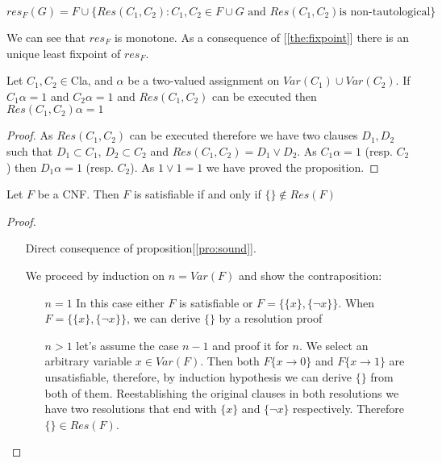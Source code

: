 $$res_F(G) = F \cup \{Res(C_1,C_2) : C_1,C_2 \in F \cup G \text{ and } Res(C_1,C_2) \text{is non-tautological}\}$$


We can see that $res_F$ is monotone. As a consequence of [\ref{the:fixpoint}] there is an unique least fixpoint of $res_F$.

\begin{proposition} \label{pro:sound}
  Let $C_1, C_2 \in $Cla, and $\alpha$ be a two-valued assignment on $Var(C_1)\cup Var(C_2)$. If $C_1 \alpha = 1$ and $C_2 \alpha = 1$ and $Res(C_1,C_2)$ can be executed then $Res(C_1,C_2) \alpha = 1$
\end{proposition}
\begin{proof}
As $Res(C_1,C_2)$ can be executed therefore we have two clauses $D_1,D_2$ such that $D_1 \subset C_1$, $D_2 \subset C_2$ and $Res(C_1,C_2) = D_1\vee D_2$. As $C_1\alpha = 1$ (resp. $C_2$) then $D_1\alpha = 1$ (resp. $C_2$). As $1 \vee 1=1$ we have proved the proposition.
\end{proof}


\begin{theorem}
Let $F$ be a CNF. Then $F$ is satisfiable if and only if $\{\} \not\in Res(F)$
\end{theorem}
\begin{proof}\hfill
  \begin{itemize}\item[\fbox{$\Rightarrow$}] Direct consequence of proposition[\ref{pro:sound}].
  \item[\fbox{$\Leftarrow$}] We proceed by induction on $n = Var(F)$ and show the contraposition:
    \begin{itemize}
    \item[$n=1$] In this case either $F$ is satisfiable or $F = \{\{x\},\{\neg x\}\}$.  When $F = \{\{x\},\{\neg x\}\}$, we can derive $\{\}$ by a resolution proof
      
    \item[$n>1$] let's assume the case $n-1$ and proof it for $n$. We select an arbitrary variable $x\in Var(F)$. Then both $F\{x\to 0\}$ and  $F\{x\to 1\}$ are unsatisfiable, therefore, by induction hypothesis we can derive $\{\}$ from both of them. Reestablishing the original clauses in both resolutions we have two resolutions that end with $\{x\}$ and $\{\neg x\}$ respectively. Therefore $\{\} \in Res(F)$.
    \end{itemize}
  \end{itemize}
\end{proof}

